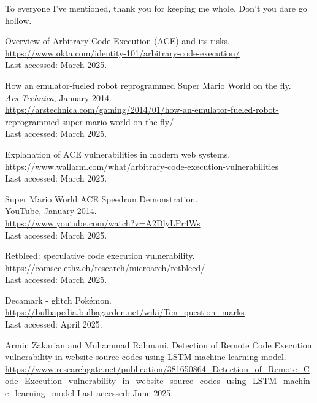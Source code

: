 \documentclass[a4paper]{usiinfbachelorproject}
\begin{document}
To everyone I've mentioned, thank you for keeping me whole. Don't you dare go hollow.

\newpage



\begin{thebibliography}{99}

	Overview of Arbitrary Code Execution (ACE) and its risks.\\
	\url{https://www.okta.com/identity-101/arbitrary-code-execution/}\\
	Last accessed: March 2025.

	How an emulator-fueled robot reprogrammed Super Mario World on the fly.\\
	\textit{Ars Technica}, January 2014.\\
	\url{https://arstechnica.com/gaming/2014/01/how-an-emulator-fueled-robot-reprogrammed-super-mario-world-on-the-fly/}\\
	Last accessed: March 2025.



	Explanation of ACE vulnerabilities in modern web systems.\\
	\url{https://www.wallarm.com/what/arbitrary-code-execution-vulnerabilities}\\
	Last accessed: March 2025.

	Super Mario World ACE Speedrun Demonstration.\\
	YouTube, January 2014.\\
	\url{https://www.youtube.com/watch?v=A2DlyLPr4Ws} \\
	Last accessed: March 2025.



	Retbleed: speculative code execution vulnerability.\\
	\url{https://comsec.ethz.ch/research/microarch/retbleed/}\\
	Last accessed: March 2025.

	Decamark - glitch Pokémon.\\
	\url{https://bulbapedia.bulbagarden.net/wiki/Ten_question_marks}  \\
	Last accessed: April 2025.



	Armin Zakarian and Muhammad Rahmani.
	Detection of Remote Code Execution vulnerability in website source codes using LSTM machine learning model.
	\url{https://www.researchgate.net/publication/381650864_Detection_of_Remote_Code_Execution_vulnerability_in_website_source_codes_using_LSTM_machine_learning_model}
	Last accessed: June 2025.


\end{thebibliography}
\end{document}
